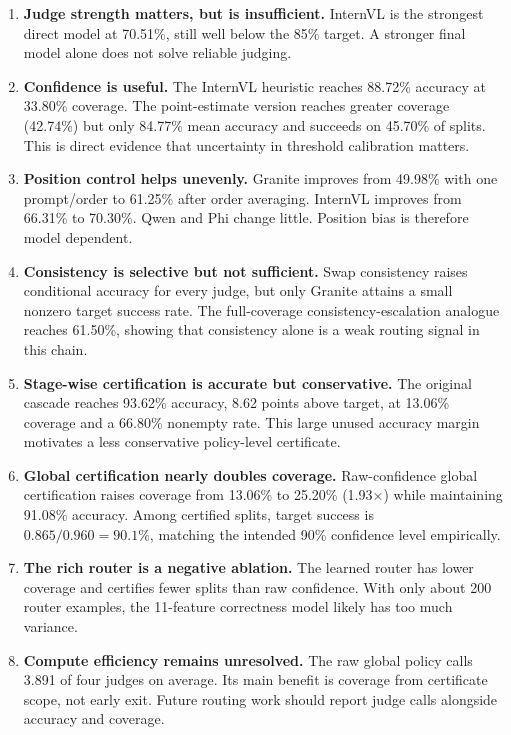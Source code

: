 \documentclass[10pt]{article}
\begin{document}
\begin{enumerate}
  \item \textbf{Judge strength matters, but is insufficient.} InternVL is the strongest
  direct model at 70.51\%, still well below the 85\% target. A stronger final model alone
  does not solve reliable judging.

  \item \textbf{Confidence is useful.} The InternVL heuristic reaches 88.72\% accuracy at
  33.80\% coverage. The point-estimate version reaches greater coverage (42.74\%) but only
  84.77\% mean accuracy and succeeds on 45.70\% of splits. This is direct evidence that
  uncertainty in threshold calibration matters.

  \item \textbf{Position control helps unevenly.} Granite improves from 49.98\% with one
  prompt/order to 61.25\% after order averaging. InternVL improves from 66.31\% to 70.30\%.
  Qwen and Phi change little. Position bias is therefore model dependent.

  \item \textbf{Consistency is selective but not sufficient.} Swap consistency raises
  conditional accuracy for every judge, but only Granite attains a small nonzero target
  success rate. The full-coverage consistency-escalation analogue reaches 61.50\%, showing
  that consistency alone is a weak routing signal in this chain.

  \item \textbf{Stage-wise certification is accurate but conservative.} The original
  cascade reaches 93.62\% accuracy, 8.62 points above target, at 13.06\% coverage and a
  66.80\% nonempty rate. This large unused accuracy margin motivates a less conservative
  policy-level certificate.

  \item \textbf{Global certification nearly doubles coverage.} Raw-confidence global
  certification raises coverage from 13.06\% to 25.20\% (1.93$\times$) while maintaining
  91.08\% accuracy. Among certified splits, target success is
  $0.865/0.960=90.1\%$, matching the intended 90\% confidence level empirically.

  \item \textbf{The rich router is a negative ablation.} The learned router has lower
  coverage and certifies fewer splits than raw confidence. With only about 200 router
  examples, the 11-feature correctness model likely has too much variance.

  \item \textbf{Compute efficiency remains unresolved.} The raw global policy calls 3.891
  of four judges on average. Its main benefit is coverage from certificate scope, not early
  exit. Future routing work should report judge calls alongside accuracy and coverage.
\end{enumerate}
\end{document}

